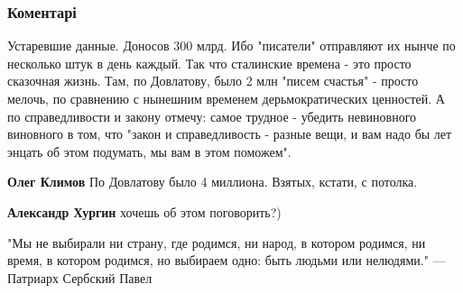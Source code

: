  
 
 
 
 
\subsubsection{Коментарі}
\label{sec:14_10_2021.fb.miheev_vladislav.1.banalnost_cifrovogo_zla.cmt}

\begin{itemize} %

Устаревшие данные. Доносов 300 млрд. Ибо "писатели" отправляют их нынче по
несколько штук в день каждый. Так что сталинские времена - это просто сказочная
жизнь. Там, по Довлатову, было 2 млн "писем счастья" - просто мелочь, по
сравнению с нынешним временем дерьмократических ценностей. А по справедливости
и закону отмечу: самое трудное - убедить невиновного виновного в том, что
"закон и справедливость - разные вещи, и вам надо бы лет энцать об этом
подумать, мы вам в этом поможем".

\textbf{Олег Климов} По Довлатову было 4 миллиона. Взятых, кстати, с потолка.

\textbf{Александр Хургин} хочешь об этом поговорить?)


"Мы не выбирали ни страну, где родимся, ни народ, в котором родимся, ни время,
в котором родимся, но выбираем одно: быть людьми или нелюдями." — Патриарх
Сербский Павел

\end{itemize} %
